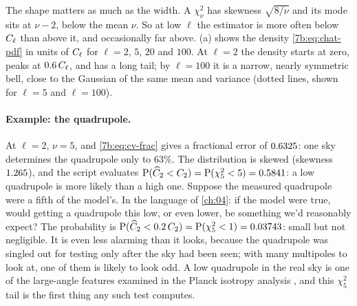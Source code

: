 The shape matters as much as the width. A $\chi^2_\nu$ has skewness $\sqrt{8/\nu}$ and its mode
sits at $\nu-2$, below the mean $\nu$. So at low $\ell$ the estimator is more often below
$C_\ell$ than above it, and occasionally far above. (a) shows the density
\eqref{7b:eq:chat-pdf} in units of $C_\ell$ for $\ell=2$, $5$, $20$ and $100$. At $\ell=2$ the
density starts at zero, peaks at $0.6\,C_\ell$, and has a long tail; by $\ell=100$ it is a narrow,
nearly symmetric bell, close to the Gaussian of the same mean and variance (dotted lines, shown
for $\ell=5$ and $\ell=100$).

\paragraph{Example: the quadrupole.} At $\ell=2$, $\nu=5$, and \eqref{7b:eq:cv-frac} gives a
fractional error of $0.6325$: one sky determines the quadrupole only to $63\%$. The
distribution is skewed (skewness $1.265$), and the script 
evaluates $\operatorname{P}(\widehat C_2<C_2)=\operatorname{P}(\chi^2_5<5)=0.5841$: a low quadrupole is more
likely than a high one. Suppose the measured quadrupole were a fifth of the model's. In the
language of \cref{ch:04}: if the model were true, would getting a quadrupole this low, or even
lower, be something we'd reasonably expect? The probability is
$\operatorname{P}(\widehat C_2<0.2\,C_2)=\operatorname{P}(\chi^2_5<1)=0.03743$: small but not negligible. It is even
less alarming than it looks, because the quadrupole was singled out for testing only after the
sky had been seen; with many multipoles to look at, one of them is likely to look odd. A low
quadrupole in the real sky is one of the large-angle features examined in the Planck isotropy
analysis \cite{Planck2018VII}, and this $\chi^2_5$ tail is the first thing any such test computes.

